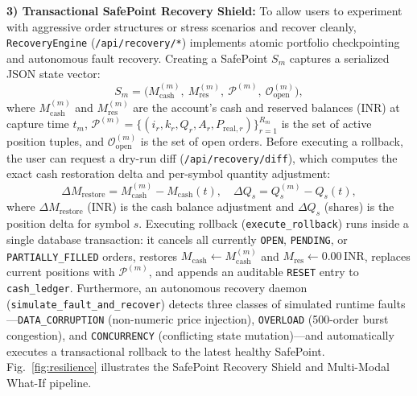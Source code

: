 \documentclass[12pt]{article}
\newcommand{\thinunit}[2]{#1\,\text{#2}}
\begin{document}
\textbf{3) Transactional SafePoint Recovery Shield:} To allow users to experiment with aggressive order structures or stress scenarios and recover cleanly, \texttt{RecoveryEngine} (\texttt{/api/recovery/*}) implements atomic portfolio checkpointing and autonomous fault recovery. Creating a SafePoint $S_m$ captures a serialized JSON state vector:
\begin{equation}
S_m = \bigl(M^{(m)}_{\mathrm{cash}},\ M^{(m)}_{\mathrm{res}},\ \mathcal{P}^{(m)},\ \mathcal{O}^{(m)}_{\mathrm{open}}\bigr),
\label{eq:safepoint}
\end{equation}
where $M^{(m)}_{\mathrm{cash}}$ and $M^{(m)}_{\mathrm{res}}$ are the account's cash and reserved balances (INR) at capture time $t_m$, $\mathcal{P}^{(m)} = \{(i_r, k_r, Q_r, A_r, P_{\mathrm{real},r})\}_{r=1}^{R_m}$ is the set of active position tuples, and $\mathcal{O}^{(m)}_{\mathrm{open}}$ is the set of open orders. Before executing a rollback, the user can request a dry-run diff (\texttt{/api/recovery/diff}), which computes the exact cash restoration delta and per-symbol quantity adjustment:
\begin{equation}
\Delta M_{\mathrm{restore}} = M^{(m)}_{\mathrm{cash}} - M_{\mathrm{cash}}(t),\quad \Delta Q_{s} = Q^{(m)}_{s} - Q_{s}(t),
\label{eq:rollback}
\end{equation}
where $\Delta M_{\mathrm{restore}}$ (INR) is the cash balance adjustment and $\Delta Q_{s}$ (shares) is the position delta for symbol $s$. Executing rollback (\texttt{execute\_rollback}) runs inside a single database transaction: it cancels all currently \texttt{OPEN}, \texttt{PENDING}, or \texttt{PARTIALLY\_FILLED} orders, restores $M_{\mathrm{cash}} \leftarrow M^{(m)}_{\mathrm{cash}}$ and $M_{\mathrm{res}} \leftarrow \thinunit{0.00}{INR}$, replaces current positions with $\mathcal{P}^{(m)}$, and appends an auditable \texttt{RESET} entry to \texttt{cash\_ledger}. Furthermore, an autonomous recovery daemon (\texttt{simulate\_fault\_and\_recover}) detects three classes of simulated runtime faults—\texttt{DATA\_CORRUPTION} (non-numeric price injection), \texttt{OVERLOAD} (500-order burst congestion), and \texttt{CONCURRENCY} (conflicting state mutation)—and automatically executes a transactional rollback to the latest healthy SafePoint. Fig.~\ref{fig:resilience} illustrates the SafePoint Recovery Shield and Multi-Modal What-If pipeline.
\end{document}
